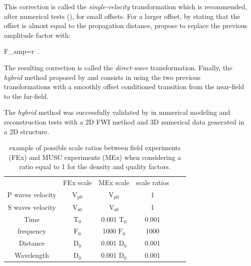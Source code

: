 \documentclass[extra,mreferee]{gji}
\begin{document}
This correction is called the \textit{single-velocity} transformation which is recommended, after numerical tests (\cite{Forbriger_LSS_2014, schafer2014lss}), for small offsets. For a larger offset, by stating that the offset is almost equal to the propagation distance, \cite{schafer2014lss} propose to replace the previous amplitude factor with:

\equation
\label{eq:direct-wave}
F_{amp}=r\ .
\endequation

The resulting correction is called the \textit{direct-wave} transformation. Finally, the \textit{hybrid} method proposed by \cite{Forbriger_LSS_2014} and \cite{schafer2014lss} consists in using the two previous transformations with a smoothly offset conditioned transition from the near-field to the far-field.

The \textit{hybrid} method was successfully validated by \cite{schafer2014lss} in numerical modeling and reconstruction tests with a 2D FWI method and 3D numerical data generated in a 2D structure. 


\clearpage
\newpage

\begin{table}
\centering
\caption{ example of possible scale ratios between field experiments (FEx) and MUSC experiments (MEx) when considering a ratio equal to 1 for the density and quality factors.}
\begin{tabular}{cccccc}
\quad & FEx scale & MEx scale & scale ratios \\
P waves velocity & $\mathrm{V_{p 0}}$ & $\mathrm{V_{p 0}}$ & 1 \\
S waves velocity & $\mathrm{V_{s 0}}$ & $\mathrm{V_{s 0}}$ & 1 \\
Time & $\mathrm{T_{0}}$ & 0.001 $\mathrm{T_{0}}$ & 0.001 \\
frequency & $\mathrm{F_{0}}$ & 1000 $\mathrm{F_{0}}$ & 1000 \\
Distance & $\mathrm{D_{0}}$ & 0.001 $\mathrm{D_{0}}$ & 0.001 \\
Wavelength & $\mathrm{D_{0}}$ & 0.001 $\mathrm{D_{0}}$ & 0.001 \\
\end{tabular}
\label{epoxy-resin}
\end{table}

\clearpage
\newpage
\end{document}
